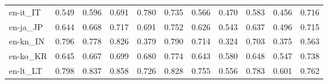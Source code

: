 \begin{tabular}{lllllllllll}
en-it\_IT & \cellcolor[HTML]{B5DF74}\textcolor[HTML]{000000}{0.549} & \cellcolor[HTML]{9BD469}\textcolor[HTML]{000000}{0.596} & \cellcolor[HTML]{57B65F}\textcolor[HTML]{000000}{0.691} & \cellcolor[HTML]{16914D}\textcolor[HTML]{FFFFFF}{0.780} & \cellcolor[HTML]{33A456}\textcolor[HTML]{FFFFFF}{0.735} & \cellcolor[HTML]{ADDC6F}\textcolor[HTML]{000000}{0.566} & \cellcolor[HTML]{DFF293}\textcolor[HTML]{000000}{0.470} & \cellcolor[HTML]{A2D76A}\textcolor[HTML]{000000}{0.583} & \cellcolor[HTML]{E3F399}\textcolor[HTML]{000000}{0.456} & \cellcolor[HTML]{42AC5A}\textcolor[HTML]{000000}{0.716} \\
en-ja\_JP & \cellcolor[HTML]{7AC665}\textcolor[HTML]{000000}{0.644} & \cellcolor[HTML]{69BE63}\textcolor[HTML]{000000}{0.668} & \cellcolor[HTML]{42AC5A}\textcolor[HTML]{000000}{0.717} & \cellcolor[HTML]{57B65F}\textcolor[HTML]{000000}{0.691} & \cellcolor[HTML]{279F53}\textcolor[HTML]{FFFFFF}{0.752} & \cellcolor[HTML]{87CB67}\textcolor[HTML]{000000}{0.626} & \cellcolor[HTML]{B9E176}\textcolor[HTML]{000000}{0.543} & \cellcolor[HTML]{7FC866}\textcolor[HTML]{000000}{0.637} & \cellcolor[HTML]{D3EC87}\textcolor[HTML]{000000}{0.496} & \cellcolor[HTML]{42AC5A}\textcolor[HTML]{000000}{0.715} \\
en-kn\_IN & \cellcolor[HTML]{128A49}\textcolor[HTML]{FFFFFF}{0.796} & \cellcolor[HTML]{17934E}\textcolor[HTML]{FFFFFF}{0.778} & \cellcolor[HTML]{0A7B41}\textcolor[HTML]{FFFFFF}{0.826} & \cellcolor[HTML]{FFFCBA}\textcolor[HTML]{000000}{0.379} & \cellcolor[HTML]{138C4A}\textcolor[HTML]{FFFFFF}{0.790} & \cellcolor[HTML]{45AD5B}\textcolor[HTML]{000000}{0.714} & \cellcolor[HTML]{FEEA9B}\textcolor[HTML]{000000}{0.324} & \cellcolor[HTML]{4EB15D}\textcolor[HTML]{000000}{0.703} & \cellcolor[HTML]{FFFBB8}\textcolor[HTML]{000000}{0.375} & \cellcolor[HTML]{ADDC6F}\textcolor[HTML]{000000}{0.563} \\
en-ko\_KR & \cellcolor[HTML]{78C565}\textcolor[HTML]{000000}{0.645} & \cellcolor[HTML]{6BBF64}\textcolor[HTML]{000000}{0.667} & \cellcolor[HTML]{51B35E}\textcolor[HTML]{000000}{0.699} & \cellcolor[HTML]{60BA62}\textcolor[HTML]{000000}{0.680} & \cellcolor[HTML]{18954F}\textcolor[HTML]{FFFFFF}{0.774} & \cellcolor[HTML]{7AC665}\textcolor[HTML]{000000}{0.643} & \cellcolor[HTML]{A5D86A}\textcolor[HTML]{000000}{0.580} & \cellcolor[HTML]{78C565}\textcolor[HTML]{000000}{0.648} & \cellcolor[HTML]{B7E075}\textcolor[HTML]{000000}{0.547} & \cellcolor[HTML]{30A356}\textcolor[HTML]{FFFFFF}{0.738} \\
en-lt\_LT & \cellcolor[HTML]{118848}\textcolor[HTML]{FFFFFF}{0.798} & \cellcolor[HTML]{07753E}\textcolor[HTML]{FFFFFF}{0.837} & \cellcolor[HTML]{016A38}\textcolor[HTML]{FFFFFF}{0.858} & \cellcolor[HTML]{3CA959}\textcolor[HTML]{FFFFFF}{0.726} & \cellcolor[HTML]{097940}\textcolor[HTML]{FFFFFF}{0.828} & \cellcolor[HTML]{249D53}\textcolor[HTML]{FFFFFF}{0.755} & \cellcolor[HTML]{B1DE71}\textcolor[HTML]{000000}{0.556} & \cellcolor[HTML]{15904C}\textcolor[HTML]{FFFFFF}{0.783} & \cellcolor[HTML]{96D268}\textcolor[HTML]{000000}{0.601} & \cellcolor[HTML]{1E9A51}\textcolor[HTML]{FFFFFF}{0.762} \\

\end{tabular}
